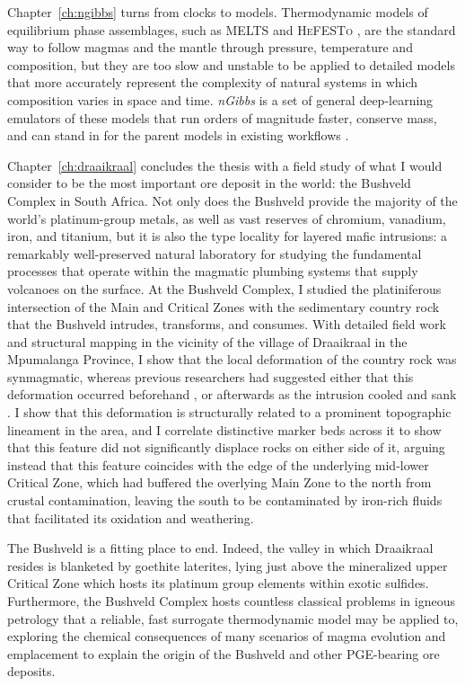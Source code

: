 Chapter~\ref{ch:ngibbs} turns from clocks to models. Thermodynamic models of
equilibrium phase assemblages, such as \textsc{MELTS} \citep{ghiorsosack1995,gualda2012} and \textsc{HeFESTo} \citep{stixrude2011,stixrude2024},
are the standard way to follow magmas and the mantle through pressure, temperature and composition, but they
are too slow and unstable to be applied to detailed models that more accurately represent the complexity of natural systems 
in which composition varies in space and time.
\emph{nGibbs} is a set of general deep-learning emulators of these models that run
orders of magnitude faster, conserve mass, and can stand in for the parent models
in existing workflows \citep{gleeson2025}. 

Chapter~\ref{ch:draaikraal} concludes the thesis with a field study of what I would consider to be the most important ore deposit in the world: 
the Bushveld Complex in South Africa. Not only does the Bushveld provide the majority of the world's platinum-group metals, as well as 
vast reserves of chromium, vanadium, iron, and titanium, but it is also the type locality for layered mafic intrusions: a 
remarkably well-preserved natural laboratory for studying the fundamental processes that operate within the magmatic plumbing 
systems that supply volcanoes on the surface. At the Bushveld Complex, I studied the platiniferous intersection of the 
Main and Critical Zones with the sedimentary country rock that the Bushveld intrudes, transforms, and consumes. With detailed field work and structural
mapping in the vicinity of the village of Draaikraal in the Mpumalanga Province, I show that the local deformation of the country rock was 
synmagmatic, whereas previous researchers had suggested either that this deformation occurred beforehand \citep{vandermerwe2007}, or 
afterwards as the intrusion cooled and sank \citep{sharpe1982}. I show that this deformation is structurally related to a prominent topographic lineament in the area, and I correlate distinctive marker 
beds across it to show that this feature did not significantly displace rocks on either side of it, arguing instead that this feature coincides
with the edge of the underlying mid-lower Critical Zone, which had buffered the overlying Main Zone to the north from crustal contamination, 
leaving the south to be contaminated by iron-rich fluids that facilitated its oxidation and weathering. 

The Bushveld is a fitting place to end. Indeed, the valley in which Draaikraal resides is blanketed by goethite laterites, lying 
just above the mineralized upper Critical Zone which hosts its platinum group elements within exotic sulfides. Furthermore, the Bushveld 
Complex hosts countless classical problems in igneous petrology that a reliable, fast surrogate thermodynamic model may be applied to, 
exploring the chemical consequences of many scenarios of magma evolution and emplacement to explain the origin of the Bushveld
and other PGE-bearing ore deposits.